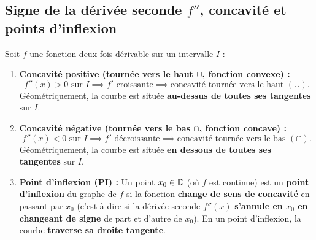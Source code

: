 \subsection{Signe de la dérivée seconde $f''$, concavité et points d'inflexion}

\begin{definition}
Soit $f$ une fonction deux fois dérivable sur un intervalle $I$ :
\begin{enumerate}
    \item \textbf{Concavité positive (tournée vers le haut $\cup$, fonction convexe) :}
    \[
        \boxed{f''(x) > 0 \text{ sur } I \implies f' \text{ croissante} \implies \text{concavité tournée vers le haut } (\cup)}.
    \]
    Géométriquement, la courbe est située \textbf{au-dessus de toutes ses tangentes} sur $I$.
    \item \textbf{Concavité négative (tournée vers le bas $\cap$, fonction concave) :}
    \[
        \boxed{f''(x) < 0 \text{ sur } I \implies f' \text{ décroissante} \implies \text{concavité tournée vers le bas } (\cap)}.
    \]
    Géométriquement, la courbe est située \textbf{en dessous de toutes ses tangentes} sur $I$.
    \item \textbf{Point d'inflexion (PI) :} Un point $x_0 \in \mathbb{D}$ (où $f$ est continue) est un \textbf{point d'inflexion} du graphe de $f$ si la fonction \textbf{change de sens de concavité} en passant par $x_0$ (c'est-à-dire si la dérivée seconde $f''(x)$ \textbf{s'annule en $x_0$ en changeant de signe} de part et d'autre de $x_0$). En un point d'inflexion, la courbe \textbf{traverse sa droite tangente}.
\end{enumerate}
\end{definition}


